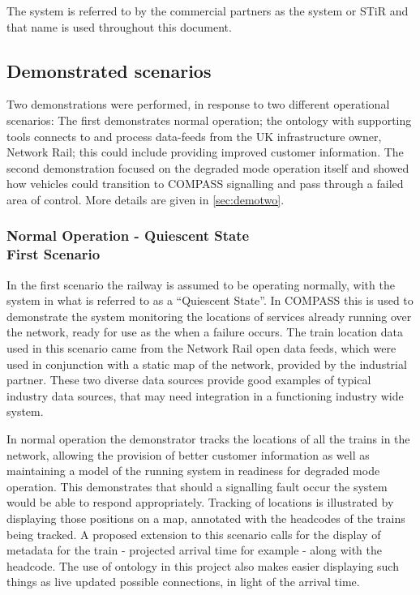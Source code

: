 The system is referred to by the commercial partners as the  system or STiR and that name is used throughout this document.
\subsection{Demonstrated scenarios}
\label{sec:Scenarios}
Two demonstrations were performed, in response to two different operational scenarios: The first demonstrates normal operation; the ontology with supporting tools connects to and process data-feeds from the UK infrastructure owner, Network Rail; this could include providing improved customer information. The second demonstration focused on the degraded mode operation itself and showed how vehicles could transition to COMPASS signalling and pass through a failed area of control. More details are given in \autoref{sec:demotwo}.

\subsubsection[Normal Operation]{Normal Operation - Quiescent State \\ First Scenario}
In the first scenario the railway is assumed to be operating normally, with the system in what is referred to as a ``Quiescent State''. In COMPASS this is used to demonstrate the system  monitoring the locations of services already running over the network, ready for use as the  when a failure occurs. The train location data used in this scenario came from the Network Rail open data feeds, which were used in conjunction with a static map of the network, provided by the industrial partner. These two diverse data sources provide good examples of typical industry data sources, that may need integration in a functioning industry wide system. 

In normal operation the demonstrator tracks the locations of all the trains in the network, allowing the provision of better customer information as well as maintaining a model of the running system in readiness for degraded mode operation. This demonstrates that should a signalling fault occur the system would be able to respond appropriately. Tracking of locations is illustrated by displaying those positions on a map, annotated with the headcodes of the trains being tracked. A proposed extension to this scenario calls for the display of metadata for the train - projected arrival time for example - along with the headcode. The use of ontology in this project also makes easier displaying such things as live updated possible connections, in light of the arrival time. 

